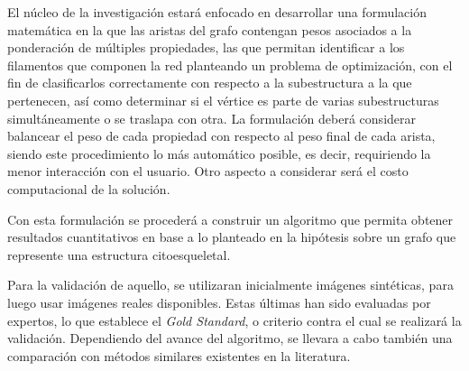\documentclass{article}
\begin{document}
El n\'ucleo de la investigaci\'on estar\'a enfocado en desarrollar una formulaci\'on matem\'atica en la que las aristas del grafo contengan pesos asociados a la ponderaci\'on de m\'ultiples propiedades, las que permitan identificar a los filamentos que componen la red planteando un problema de optimizaci\'on, con el fin de clasificarlos correctamente con respecto a la subestructura a la que pertenecen, as\'i como determinar si el v\'ertice es parte de varias subestructuras simult\'aneamente o se traslapa con otra.
La formulaci\'on deber\'a considerar balancear el peso de cada propiedad con respecto al peso final de cada arista, siendo este procedimiento lo m\'as autom\'atico posible, es decir, requiriendo la menor interacci\'on con el usuario. Otro aspecto a considerar ser\'a el costo computacional de la soluci\'on.

Con esta formulaci\'on se proceder\'a a construir un algoritmo que permita obtener resultados cuantitativos en base a lo planteado en la hip\'otesis sobre un grafo que represente una estructura citoesqueletal. 

Para la validaci\'on de aquello, se utilizaran inicialmente im\'agenes sint\'eticas, para luego usar im\'agenes reales disponibles. Estas \'ultimas han sido evaluadas por expertos, lo que establece el \textit{Gold Standard}, o criterio contra el cual se realizar\'a la validaci\'on. Dependiendo del avance del algoritmo, se llevara a cabo tambi\'en una comparaci\'on con m\'etodos similares existentes en la literatura. 





\end{document}
